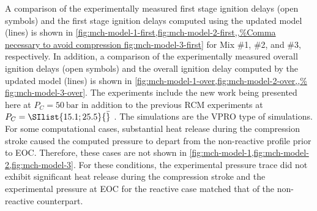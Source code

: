 \documentclass[../main.tex]{subfiles}
\begin{document}
A comparison of the experimentally measured first stage ignition delays (open
symbols) and the first stage ignition delays computed using the updated model
(lines) is shown in \cref{fig:mch-model-1-first,fig:mch-model-2-first,,%
fig:mch-model-3-first} for Mix \#1, \#2, and \#3, respectively. In
addition, a comparison of the experimentally measured overall ignition delays
(open symbols) and the overall ignition delay computed by the updated model
(lines) is shown in \cref{fig:mch-model-1-over,fig:mch-model-2-over,,%
fig:mch-model-3-over}. The experiments include the new work being
presented here at $P_C=\SI{50}{\bar}$ in addition to the previous RCM experiments at
$P_C=\SIlist{15.1;25.5}{\bar}$ \cite{Mittal2009}. The simulations are the VPRO type
of simulations. For some computational cases, substantial heat release during
the compression stroke caused the computed pressure to depart from the
non-reactive profile prior to EOC. Therefore, these cases are not shown in
\cref{fig:mch-model-1,fig:mch-model-2,fig:mch-model-3}. For these conditions, the
experimental pressure trace did not exhibit significant heat release during
the compression stroke and the experimental pressure at EOC for the reactive
case matched that of the non-reactive counterpart.
\end{document}
